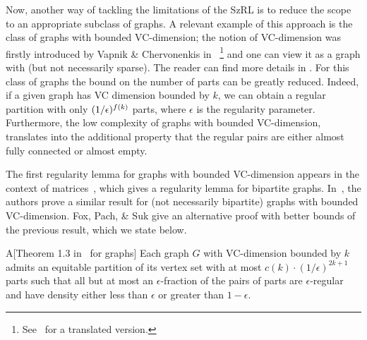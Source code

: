         Now, another way of tackling the limitations of the SzRL is to reduce the scope to an appropriate subclass of graphs.
        A relevant example of this approach is the class of graphs with bounded VC-dimension;
        the notion of VC-dimension was firstly introduced by Vapnik \& Chervonenkis
        in~\cite{the_uniform_convergence_of_frequencies_of_the_appearance_of_events_to_their_probabilities}
        \hspace{-3pt}\footnote{
            See~\cite{on_the_uniform_convergence_of_relative_frequencies_of_events_to_their_probabilities}
            for a translated version.}
        and one can view it as a graph with  (but not necessarily sparse).
        The reader can find more details in .
        For this class of graphs the bound on the number of parts can be greatly reduced.
        Indeed, if a given graph has VC dimension bounded by $k$, we can obtain a regular partition with only
        $( {1}/{\epsilon} )^{f(k)}$ parts, where $\epsilon$ is the regularity parameter.
        Furthermore, the low complexity of graphs with bounded VC-dimension, translates into the additional property that the
        regular pairs are either almost fully connected or almost empty.

        The first regularity lemma for graphs with bounded VC-dimension appears in the context of
        matrices~\cite{efficient_testing_of_bipartite_graphs_for_forbidden_induced_subgraphs}, which gives
        a regularity lemma for bipartite graphs.
        In~\cite{regularity_partitions_and_the_topology_of_graphons}, the authors prove a similar result for
        (not necessarily bipartite) graphs with bounded VC-dimension.
        Fox, Pach, \& Suk give an alternative proof with better bounds of the previous result, which we state below.

        \begin{thm*}{A}[Theorem 1.3 in~\cite{erdos_hajnal_conjecture_for_graphs_with_bounded_vc_dimension} for graphs]
            \label{thm:A}
            Each graph $G$ with VC-dimension bounded by $k$ admits an equitable partition of its vertex set with at most
            $c(k)\cdot(1/\epsilon)^{2k+1}$ parts such that all but at most an $\epsilon$-fraction of the pairs of parts
            are $\epsilon$-regular and have density either less than $\epsilon$ or greater than $1 - \epsilon$.
        \end{thm*}

